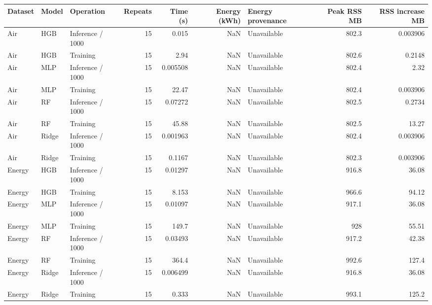\begin{tabular}{lllrrrlrr}
\toprule
Dataset & Model & Operation & Repeats & Time (s) & Energy (kWh) & Energy provenance & Peak RSS MB & RSS increase MB \\
\midrule
Air & HGB & Inference / 1000 & 15 & 0.015 & NaN & Unavailable & 802.3 & 0.003906 \\
Air & HGB & Training & 15 & 2.94 & NaN & Unavailable & 802.6 & 0.2148 \\
Air & MLP & Inference / 1000 & 15 & 0.005508 & NaN & Unavailable & 802.4 & 2.32 \\
Air & MLP & Training & 15 & 22.47 & NaN & Unavailable & 802.4 & 0.003906 \\
Air & RF & Inference / 1000 & 15 & 0.07272 & NaN & Unavailable & 802.5 & 0.2734 \\
Air & RF & Training & 15 & 45.88 & NaN & Unavailable & 802.5 & 13.27 \\
Air & Ridge & Inference / 1000 & 15 & 0.001963 & NaN & Unavailable & 802.4 & 0.003906 \\
Air & Ridge & Training & 15 & 0.1167 & NaN & Unavailable & 802.3 & 0.003906 \\
Energy & HGB & Inference / 1000 & 15 & 0.01297 & NaN & Unavailable & 916.8 & 36.08 \\
Energy & HGB & Training & 15 & 8.153 & NaN & Unavailable & 966.6 & 94.12 \\
Energy & MLP & Inference / 1000 & 15 & 0.01097 & NaN & Unavailable & 917.1 & 36.08 \\
Energy & MLP & Training & 15 & 149.7 & NaN & Unavailable & 928 & 55.51 \\
Energy & RF & Inference / 1000 & 15 & 0.03493 & NaN & Unavailable & 917.2 & 42.38 \\
Energy & RF & Training & 15 & 364.4 & NaN & Unavailable & 992.6 & 127.4 \\
Energy & Ridge & Inference / 1000 & 15 & 0.006499 & NaN & Unavailable & 916.8 & 36.08 \\
Energy & Ridge & Training & 15 & 0.333 & NaN & Unavailable & 993.1 & 125.2 \\
\bottomrule
\end{tabular}
